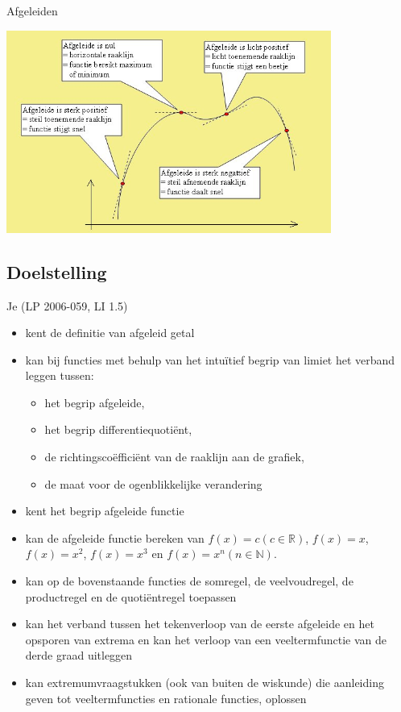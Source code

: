 \documentclass[a4paper,12pt,twoside]{article}
\begin{document}
\thispagestyle{empty}
\begin{center}
  \begin{mdframed}
    \centering
    \fontsize{50}{60}\selectfont Afgeleiden
  \end{mdframed}
  \vfill
  \includegraphics[width=0.8\textwidth]{afgeleide}
  \vfill
\end{center}
\vfill
\subsection*{Doelstelling}
{\singlespacing
Je \hfill  {\scriptsize(LP 2006-059, LI 1.5)}
\begin{itemize}
\item kent de definitie van afgeleid getal
\item kan bij functies met behulp van het intuïtief begrip van limiet het verband leggen tussen:
  \begin{itemize}
  \item het begrip afgeleide,
  \item het begrip differentiequotiënt,
  \item de richtingscoëfficiënt van de raaklijn aan de grafiek,
  \item de maat voor de ogenblikkelijke verandering
  \end{itemize}
\item kent het begrip afgeleide functie
\item kan de afgeleide functie bereken van $f(x)=c (c\in\mathbb{R})$, $f(x)=x$, $f(x)=x^2$, $f(x)=x^3$ en $f(x)=x^n (n\in\mathbb{N})$.
\item kan op de bovenstaande functies de somregel, de veelvoudregel, de productregel en de quotiëntregel toepassen
\item kan het verband tussen het tekenverloop van de eerste afgeleide en het opsporen van extrema en kan het verloop van een veeltermfunctie van de derde graad uitleggen
\item kan extremumvraagstukken (ook van buiten de wiskunde) die aanleiding geven tot veeltermfuncties en rationale functies, oplossen
\end{itemize}
}
\end{document}
